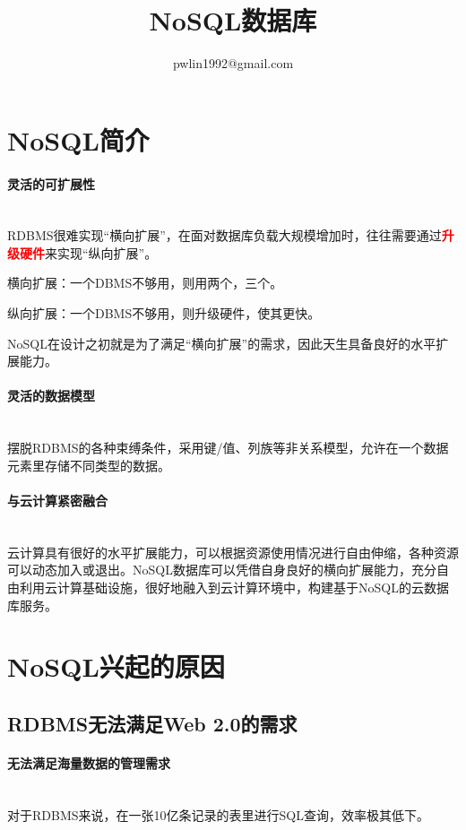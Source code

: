 \documentclass{article}
\title{NoSQL数据库}
\author{pwlin1992@gmail.com}
\begin{document}
\maketitle
\tableofcontents
\begin{large}
  \section{NoSQL简介}
  \paragraph{灵活的可扩展性}\mbox{} \\
  RDBMS很难实现“横向扩展”，在面对数据库负载大规模增加时，往往需要通过\textcolor{red}{\textbf{升级硬件}}来实现“纵向扩展”。

  横向扩展：一个DBMS不够用，则用两个，三个。

  纵向扩展：一个DBMS不够用，则升级硬件，使其更快。

  NoSQL在设计之初就是为了满足“横向扩展”的需求，因此天生具备良好的水平扩展能力。
  \paragraph{灵活的数据模型}\mbox{} \\
  摆脱RDBMS的各种束缚条件，采用键/值、列族等非关系模型，允许在一个数据元素里存储不同类型的数据。

  \paragraph{与云计算紧密融合}\mbox{} \\
  云计算具有很好的水平扩展能力，可以根据资源使用情况进行自由伸缩，各种资源可以动态加入或退出。NoSQL数据库可以凭借自身良好的横向扩展能力，充分自由利用云计算基础设施，很好地融入到云计算环境中，构建基于NoSQL的云数据库服务。

  \section{NoSQL兴起的原因}
  \subsection{RDBMS无法满足Web 2.0的需求}
  \paragraph{无法满足海量数据的管理需求}\mbox{} \\
  对于RDBMS来说，在一张10亿条记录的表里进行SQL查询，效率极其低下。


\end{large}
\end{document}
